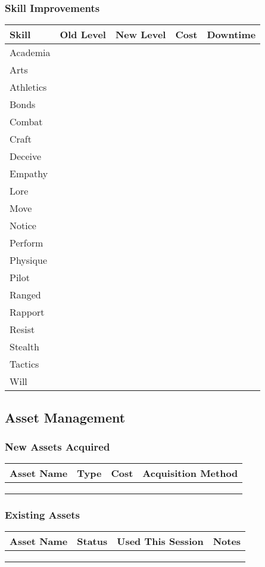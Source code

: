 \subsubsection{Skill Improvements}
\begin{tabular}{|p{4cm}|c|c|c|c|}
\hline
\textbf{Skill} & \textbf{Old Level} & \textbf{New Level} & \textbf{Cost} & \textbf{Downtime} \\
\hline
Academia & & & & \\
Arts & & & & \\
Athletics & & & & \\
Bonds & & & & \\
Combat & & & & \\
Craft & & & & \\
Deceive & & & & \\
Empathy & & & & \\
Lore & & & & \\
Move & & & & \\
Notice & & & & \\
Perform & & & & \\
Physique & & & & \\
Pilot & & & & \\
Ranged & & & & \\
Rapport & & & & \\
Resist & & & & \\
Stealth & & & & \\
Tactics & & & & \\
Will & & & & \\
\hline
\end{tabular}

\subsection{Asset Management}

\subsubsection{New Assets Acquired}
\begin{tabular}{|p{3cm}|p{2cm}|p{2cm}|p{3cm}|}
\hline
\textbf{Asset Name} & \textbf{Type} & \textbf{Cost} & \textbf{Acquisition Method} \\
\hline
& & & \\
& & & \\
& & & \\
\hline
\end{tabular}

\subsubsection{Existing Assets}
\begin{tabular}{|p{4cm}|p{2cm}|p{2cm}|p{2cm}|}
\hline
\textbf{Asset Name} & \textbf{Status} & \textbf{Used This Session} & \textbf{Notes} \\
\hline
& & & \\
& & & \\
& & & \\
\hline
\end{tabular}

